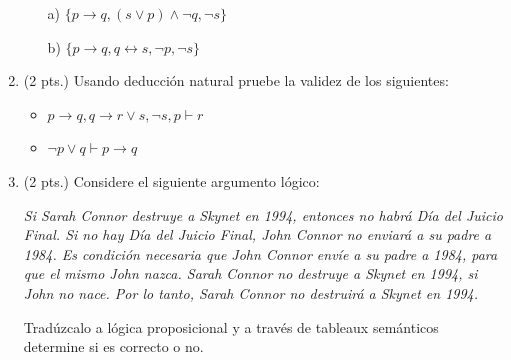 \documentclass[11pt,letterpaper]{article}
\begin{document}
\begin{enumerate}
    \begin{itemize}
       \item[a)] $\{ p \rightarrow q, (s \lor p) \land \neg q, \neg s \}$
       \item[b)] $\{ p \rightarrow q, q \leftrightarrow s, \neg p, \neg s \}$
    \end{itemize}

  \bigskip

  \item (2 pts.) Usando deducción natural pruebe la validez de los siguientes:

    \begin{itemize}
       \item $p \rightarrow q, q \rightarrow r \lor s, \neg s, p \vdash r$
       \item $\neg p \lor q \vdash p \rightarrow q$
    \end{itemize}

  \bigskip

  \item (2 pts.) Considere el siguiente argumento lógico:

    \textit{Si Sarah Connor destruye a Skynet en 1994, entonces no habrá Día del Juicio Final. Si no hay Día del Juicio Final, John Connor no enviará a su padre a 1984. Es condición necesaria que John Connor envíe a su padre a 1984, para que el mismo John nazca. Sarah Connor no destruye a Skynet en 1994, si John no nace. Por lo tanto, Sarah Connor no destruirá a Skynet en 1994.}

   Tradúzcalo a lógica proposicional y a través de tableaux semánticos determine si es correcto o no.

\end{enumerate}
\end{document}

